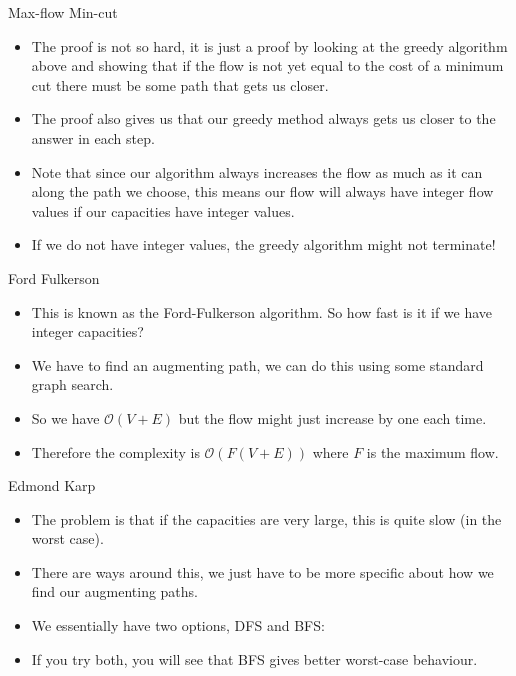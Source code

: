 \documentclass{beamer}
\begin{document}
	\begin{frame}[plain]{Max-flow Min-cut}
		\begin{itemize}
			\item The proof is not so hard, it is just a proof by looking at the greedy algorithm above and showing that if the flow is not yet equal to the cost of a minimum cut there must be some path that gets us closer.
			\item The proof also gives us that our greedy method always gets us closer to the answer in each step.
			\item Note that since our algorithm always increases the flow as much as it can along the path we choose, this means our flow will always have integer flow values if our capacities have integer values.
			\item If we do not have integer values, the greedy algorithm might not terminate!
		\end{itemize}
	\end{frame}
	
	\begin{frame}[plain]{Ford Fulkerson}
		\begin{itemize}
			\item This is known as the Ford-Fulkerson algorithm. So how fast is it if we have integer capacities?
			\item We have to find an augmenting path, we can do this using some standard graph search.
			\item<2-> So we have $\mathcal{O}(V + E)$ but the flow might just increase by one each time.
			\item<2-> Therefore the complexity is $\mathcal{O}(F(V + E))$ where $F$ is the maximum flow.
		\end{itemize}
	\end{frame}
	
	\begin{frame}[plain]{Edmond Karp}
		\begin{itemize}
			\item The problem is that if the capacities are very large, this is quite slow (in the worst case).
			\item There are ways around this, we just have to be more specific about how we find our augmenting paths.
			\item We essentially have two options, DFS and BFS:
			\item If you try both, you will see that BFS gives better worst-case behaviour.
		\end{itemize}
	\end{frame}
	
\end{document}
